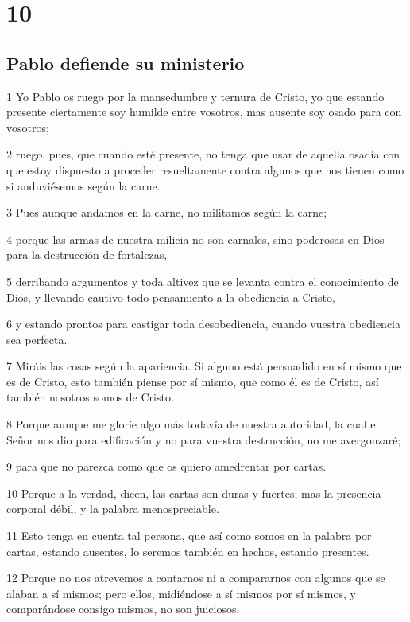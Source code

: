 \chapter{10}

\section*{Pablo defiende su ministerio}

\par 1 Yo Pablo os ruego por la mansedumbre y ternura de Cristo, yo que estando presente ciertamente soy humilde entre vosotros, mas ausente soy osado para con vosotros;
\par 2 ruego, pues, que cuando esté presente, no tenga que usar de aquella osadía con que estoy dispuesto a proceder resueltamente contra algunos que nos tienen como si anduviésemos según la carne.
\par 3 Pues aunque andamos en la carne, no militamos según la carne;
\par 4 porque las armas de nuestra milicia no son carnales, sino poderosas en Dios para la destrucción de fortalezas,
\par 5 derribando argumentos y toda altivez que se levanta contra el conocimiento de Dios, y llevando cautivo todo pensamiento a la obediencia a Cristo,
\par 6 y estando prontos para castigar toda desobediencia, cuando vuestra obediencia sea perfecta.
\par 7 Miráis las cosas según la apariencia. Si alguno está persuadido en sí mismo que es de Cristo, esto también piense por sí mismo, que como él es de Cristo, así también nosotros somos de Cristo.
\par 8 Porque aunque me gloríe algo más todavía de nuestra autoridad, la cual el Señor nos dio para edificación y no para vuestra destrucción, no me avergonzaré;
\par 9 para que no parezca como que os quiero amedrentar por cartas.
\par 10 Porque a la verdad, dicen, las cartas son duras y fuertes; mas la presencia corporal débil, y la palabra menospreciable.
\par 11 Esto tenga en cuenta tal persona, que así como somos en la palabra por cartas, estando ausentes, lo seremos también en hechos, estando presentes.
\par 12 Porque no nos atrevemos a contarnos ni a compararnos con algunos que se alaban a sí mismos; pero ellos, midiéndose a sí mismos por sí mismos, y comparándose consigo mismos, no son juiciosos.
